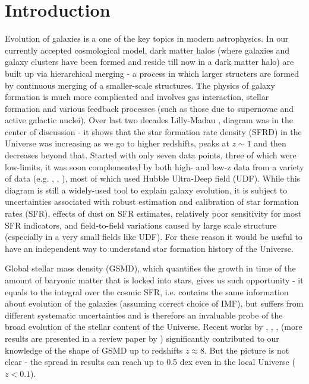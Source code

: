 \chapter{Introduction}\label{CH_Intro}

Evolution of galaxies is a one of the key topics in modern astrophysics. In our currently accepted cosmological model, dark matter halos (where galaxies and galaxy clusters have been formed and reside till now in a dark matter halo) are built up via hierarchical merging - a process in which larger structers are formed by continuous merging of a smaller-scale structures. The physics of galaxy formation is much more complicated and involves gas interaction, stellar formation and various feedback processes (such as those due to supernovae and active galactic nuclei). Over last two decades Lilly-Madau \citep{1996ApJ...460L...1L}, \citep{1996MNRAS.283.1388M} diagram was in the center of discussion - it shows that the star formation rate density (SFRD) in the Universe was increasing as we go to higher redshifts, peaks at $z\sim1$ and then decreases beyond that. Started with  only seven data points, three of which were low-limits, it was soon complemented by both high- and low-z data from a variety of data (e.g. \citep{2004ApJ...606L..25B}, \citep{2004ApJ...616L..79B}, \citep{2004MNRAS.355..374B}), most of which used Hubble Ultra-Deep field (UDF). While this diagram is still a widely-used tool to explain galaxy evolution, it is subject to uncertainties associated with robust estimation and calibration of star formation rates (SFR), effects of dust on SFR estimates, relatively poor sensitivity for most SFR indicators, and field-to-field variations caused by large scale structure (especially in a very small fields like UDF). For these reason it would be useful to have an independent way to understand star formation history of the Universe.

Global stellar mass density (GSMD), which quantifies the growth in time of the amount of baryonic matter that is locked into stars, gives us such opportunity - it equals to the integral over the cosmic SFR, i.e. contains the same information about evolution of the galaxies (assuming correct choice of IMF), but suffers from different systematic uncertainties and is therefore an invaluable probe of the broad evolution of the stellar content of the Universe. Recent works by \citep{2013ApJ...767...50M}, \citep{2012A&A...545A..23B}, \citep{2012A&A...545A..23B}, \citep{2013ApJ...777...18M} (more results are presented in a review paper by \citep{Madau2014}) significantly contributed to our knowledge of the shape of GSMD up to redshifts $z\approx8$. But the picture is not clear - the spread in results can reach up to 0.5 dex even in the local Universe ($z<0.1$). \\

